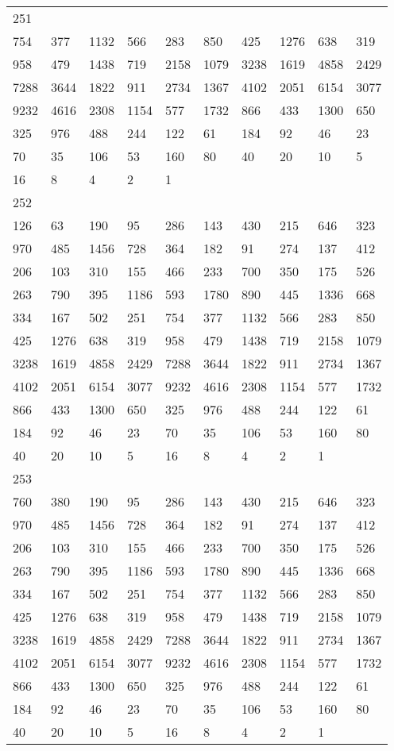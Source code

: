 \begin{longtable}{*{10}{l}}
251&&&&&&&&&\\
754& 377& 1132& 566& 283& 850& 425& 1276& 638& 319\\
958& 479& 1438& 719& 2158& 1079& 3238& 1619& 4858& 2429\\
7288& 3644& 1822& 911& 2734& 1367& 4102& 2051& 6154& 3077\\
9232& 4616& 2308& 1154& 577& 1732& 866& 433& 1300& 650\\
325& 976& 488& 244& 122& 61& 184& 92& 46& 23\\
70& 35& 106& 53& 160& 80& 40& 20& 10& 5\\
16& 8& 4& 2& 1& \\

252&&&&&&&&&\\
126& 63& 190& 95& 286& 143& 430& 215& 646& 323\\
970& 485& 1456& 728& 364& 182& 91& 274& 137& 412\\
206& 103& 310& 155& 466& 233& 700& 350& 175& 526\\
263& 790& 395& 1186& 593& 1780& 890& 445& 1336& 668\\
334& 167& 502& 251& 754& 377& 1132& 566& 283& 850\\
425& 1276& 638& 319& 958& 479& 1438& 719& 2158& 1079\\
3238& 1619& 4858& 2429& 7288& 3644& 1822& 911& 2734& 1367\\
4102& 2051& 6154& 3077& 9232& 4616& 2308& 1154& 577& 1732\\
866& 433& 1300& 650& 325& 976& 488& 244& 122& 61\\
184& 92& 46& 23& 70& 35& 106& 53& 160& 80\\
40& 20& 10& 5& 16& 8& 4& 2& 1& \\

253&&&&&&&&&\\
760& 380& 190& 95& 286& 143& 430& 215& 646& 323\\
970& 485& 1456& 728& 364& 182& 91& 274& 137& 412\\
206& 103& 310& 155& 466& 233& 700& 350& 175& 526\\
263& 790& 395& 1186& 593& 1780& 890& 445& 1336& 668\\
334& 167& 502& 251& 754& 377& 1132& 566& 283& 850\\
425& 1276& 638& 319& 958& 479& 1438& 719& 2158& 1079\\
3238& 1619& 4858& 2429& 7288& 3644& 1822& 911& 2734& 1367\\
4102& 2051& 6154& 3077& 9232& 4616& 2308& 1154& 577& 1732\\
866& 433& 1300& 650& 325& 976& 488& 244& 122& 61\\
184& 92& 46& 23& 70& 35& 106& 53& 160& 80\\
40& 20& 10& 5& 16& 8& 4& 2& 1& \\


\end{longtable}
